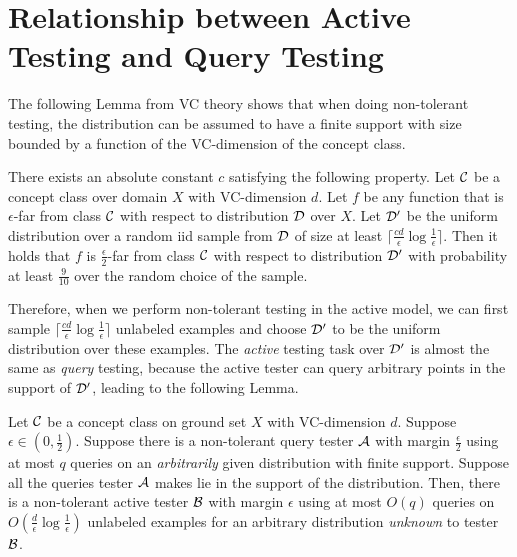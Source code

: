 \section{Relationship between Active Testing and Query Testing}
\label{sec:relationship}
The following Lemma from VC theory shows that when doing non-tolerant testing, the distribution can be assumed to have a finite support with size bounded by a function of the VC-dimension of the concept class.
\begin{lemma}
\label{lm:D'}
There exists an absolute constant $c$ satisfying the following property. Let ${\mathcal{C}}$ be a concept class over  domain $X$ with VC-dimension $d$. Let $f$ be any function that is $\epsilon$-far from class ${\mathcal{C}}$ with respect to distribution ${\mathcal{D}}$ over $X$. Let ${\mathcal{D}}'$ be the uniform distribution over a random iid sample from ${\mathcal{D}}$ of size at least $\lceil\frac{cd}{\epsilon}\log\frac{1}{\epsilon}\rceil$. Then it holds that $f$ is $\frac{\epsilon}{2}$-far from class ${\mathcal{C}}$ with respect to distribution ${\mathcal{D}}'$ with probability at least $\frac{9}{10}$ over the random choice of the sample.
\end{lemma}

Therefore, when we perform non-tolerant testing in the active model, we can first sample $\lceil\frac{cd}{\epsilon}\log\frac{1}{\epsilon}\rceil$ unlabeled examples and choose ${\mathcal{D}}'$ to be the uniform distribution over these examples. The \emph{active} testing task over ${\mathcal{D}}'$ is almost the same as \emph{query} testing, because the active tester can query arbitrary points in the support of ${\mathcal{D}}'$, leading to the following Lemma.

\begin{lemma}
\label{thm:unlabeled}
Let ${\mathcal{C}}$ be a concept class on ground set $X$ with VC-dimension $d$. Suppose $\epsilon\in(0,\frac{1}{2})$. Suppose there is a non-tolerant query tester ${\mathcal{A}}$ with margin $\frac{\epsilon}{2}$ using at most $q$ queries on an \emph{arbitrarily} given distribution with finite support. Suppose all the queries tester ${\mathcal{A}}$ makes lie in the support of the distribution.
Then, there is a non-tolerant active tester ${\mathcal B}$ with margin $\epsilon$ using at most $O(q)$ queries on $O(\frac{d}{\epsilon}\log\frac{1}{\epsilon})$ unlabeled examples for an arbitrary distribution \emph{unknown} to tester ${\mathcal B}$.
\end{lemma}

